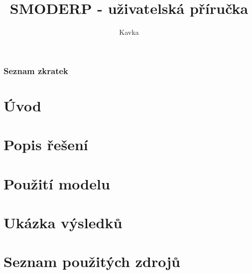\documentclass[a4paper, 11pt, twoside]{article}
\begin{document}
\title{SMODERP - uživatelská příručka}
\author{Kavka}


\clearpage\maketitle
\thispagestyle{empty}



\newpage
{}\setcounter{page}{1} %
\tableofcontents{}


\newpage
\section*{Seznam zkratek}
\begin{multicols}{2}

\end{multicols}



\newpage
{}\setcounter{page}{1}%
\part*{Úvod}



\newpage
\part{Popis řešení}






\newpage
\part{Použití modelu}


\newpage
\part{Ukázka výsledků}


\newpage
\part*{Seznam použitých zdrojů}

\end{document}
